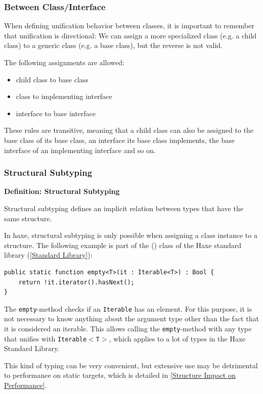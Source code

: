 \documentclass{article}
\newcommand{\type}[1]{\texttt{#1}}
\newcommand{\expr}[1]{\texttt{#1}}
\newenvironment{myshaded}
  {\def\FrameCommand{\fboxsep=\topsep\colorbox{bgcolor}}%
  \MakeFramed {\advance\hsize-\width \FrameRestore}}%
 {\endMakeFramed}
\newcommand{\define}[3][Definition]
	{\begin{myshaded}\noindent\textbf{#1: #2}\par\nobreak\noindent\ignorespaces#3\label{def:#2}\end{myshaded}}
\newcommand{\Fullref}[1]{\nameref{#1} (\Cref{#1})}
\begin{document}
\subsubsection{Between Class/Interface}

When defining unification behavior between classes, it is important to remember that unification is directional: We can assign a more specialized class (e.g. a child class) to a generic class (e.g. a base class), but the reverse is not valid.

The following assignments are allowed:

\begin{itemize}
	\item child class to base class
	\item class to implementing interface
	\item interface to base interface
\end{itemize}
These rules are transitive, meaning that a child class can also be assigned to the base class of its base class, an interface its base class implements, the base interface of an implementing interface and so on.


\subsubsection{Structural Subtyping}
\label{Structural Subtyping}

\define{Structural Subtyping}{Structural subtyping defines an implicit relation between types that have the same structure.}

In haxe, structural subtyping is only possible when assigning a class instance to a structure. The following example is part of the \Fullref{Lambda} class of the Haxe standard library (\cref{Standard Library}):

\begin{lstlisting}
public static function empty<T>(it : Iterable<T>) : Bool {
	return !it.iterator().hasNext();
}
\end{lstlisting}
The \expr{empty}-method checks if an \type{Iterable} has an element. For this purpose, it is not necessary to know anything about the argument type other than the fact that it is considered an iterable. This allows calling the \expr{empty}-method with any type that unifies with \type{Iterable$<$T$>$}, which applies to a lot of types in the Haxe Standard Library.

This kind of typing can be very convenient, but extensive use may be detrimental to performance on static targets, which is detailed in \cref{Structure Impact on Performance}.
\end{document}
